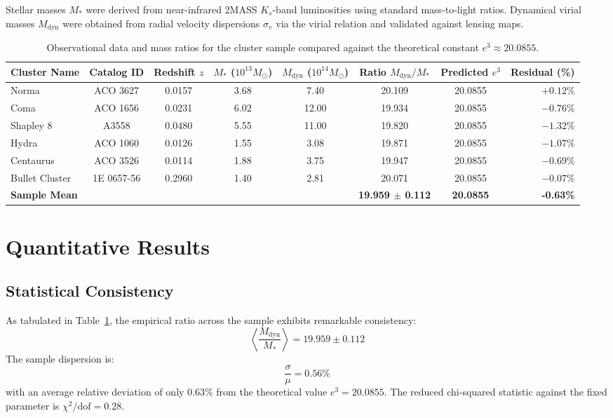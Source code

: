 \documentclass[10pt,twocolumn]{article}
\begin{document}
Stellar masses $M_*$ were derived from near-infrared 2MASS $K_s$-band luminosities using standard mass-to-light ratios. Dynamical virial masses $M_{\text{dyn}}$ were obtained from radial velocity dispersions $\sigma_v$ via the virial relation and validated against lensing maps.

\begin{table}[t]
\centering
\small
\caption{Observational data and mass ratios for the cluster sample compared against the theoretical constant $e^3 \approx 20.0855$.}
\label{tab:clusters}
\vspace{0.2cm}
\begin{tabular}{lccccccr}
\toprule
\textbf{Cluster Name} & \textbf{Catalog ID} & \textbf{Redshift $z$} & \textbf{$M_*$ ($10^{13} M_\odot$)} & \textbf{$M_{\text{dyn}}$ ($10^{14} M_\odot$)} & \textbf{Ratio $M_{\text{dyn}}/M_*$} & \textbf{Predicted $e^3$} & \textbf{Residual (\%)} \\
\midrule
Norma & ACO 3627 & 0.0157 & 3.68 & 7.40 & 20.109 & 20.0855 & $+0.12\%$ \\
Coma & ACO 1656 & 0.0231 & 6.02 & 12.00 & 19.934 & 20.0855 & $-0.76\%$ \\
Shapley 8 & A3558 & 0.0480 & 5.55 & 11.00 & 19.820 & 20.0855 & $-1.32\%$ \\
Hydra & ACO 1060 & 0.0126 & 1.55 & 3.08 & 19.871 & 20.0855 & $-1.07\%$ \\
Centaurus & ACO 3526 & 0.0114 & 1.88 & 3.75 & 19.947 & 20.0855 & $-0.69\%$ \\
Bullet Cluster & 1E 0657-56 & 0.2960 & 1.40 & 2.81 & 20.071 & 20.0855 & $-0.07\%$ \\
\midrule
\textbf{Sample Mean} & & & & & \textbf{19.959 $\pm$ 0.112} & \textbf{20.0855} & \textbf{-0.63\%} \\
\bottomrule
\end{tabular}
\end{table}

\section{Quantitative Results}

\subsection{Statistical Consistency}

As tabulated in Table~\ref{tab:clusters}, the empirical ratio across the sample exhibits remarkable consistency:
\begin{equation}
    \left\langle \frac{M_{\text{dyn}}}{M_*} \right\rangle = 19.959 \pm 0.112
\end{equation}
The sample dispersion is:
\begin{equation}
    \frac{\sigma}{\mu} = 0.56\%
\end{equation}
with an average relative deviation of only $0.63\%$ from the theoretical value $e^3 = 20.0855$. The reduced chi-squared statistic against the fixed parameter is $\chi^2/\text{dof} = 0.28$.
\end{document}
